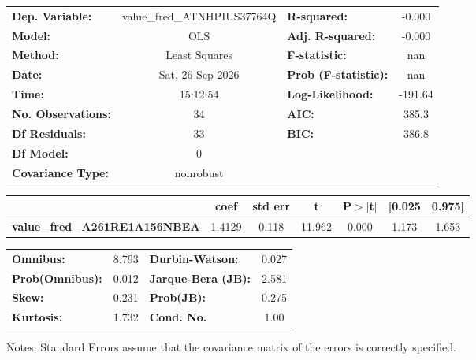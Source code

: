 \begin{center}
\begin{tabular}{lclc}
\toprule
\textbf{Dep. Variable:}               & value\_fred\_ATNHPIUS37764Q & \textbf{  R-squared:         } &    -0.000   \\
\textbf{Model:}                       &             OLS             & \textbf{  Adj. R-squared:    } &    -0.000   \\
\textbf{Method:}                      &        Least Squares        & \textbf{  F-statistic:       } &       nan   \\
\textbf{Date:}                        &       Sat, 26 Sep 2026      & \textbf{  Prob (F-statistic):} &      nan    \\
\textbf{Time:}                        &           15:12:54          & \textbf{  Log-Likelihood:    } &   -191.64   \\
\textbf{No. Observations:}            &                34           & \textbf{  AIC:               } &     385.3   \\
\textbf{Df Residuals:}                &                33           & \textbf{  BIC:               } &     386.8   \\
\textbf{Df Model:}                    &                 0           & \textbf{                     } &             \\
\textbf{Covariance Type:}             &          nonrobust          & \textbf{                     } &             \\
\bottomrule
\end{tabular}
\begin{tabular}{lcccccc}
                                      & \textbf{coef} & \textbf{std err} & \textbf{t} & \textbf{P$> |$t$|$} & \textbf{[0.025} & \textbf{0.975]}  \\
\midrule
\textbf{value\_fred\_A261RE1A156NBEA} &       1.4129  &        0.118     &    11.962  &         0.000        &        1.173    &        1.653     \\
\bottomrule
\end{tabular}
\begin{tabular}{lclc}
\textbf{Omnibus:}       &  8.793 & \textbf{  Durbin-Watson:     } &    0.027  \\
\textbf{Prob(Omnibus):} &  0.012 & \textbf{  Jarque-Bera (JB):  } &    2.581  \\
\textbf{Skew:}          &  0.231 & \textbf{  Prob(JB):          } &    0.275  \\
\textbf{Kurtosis:}      &  1.732 & \textbf{  Cond. No.          } &     1.00  \\
\bottomrule
\end{tabular}
\end{center}

Notes: \newline
 [1] Standard Errors assume that the covariance matrix of the errors is correctly specified.